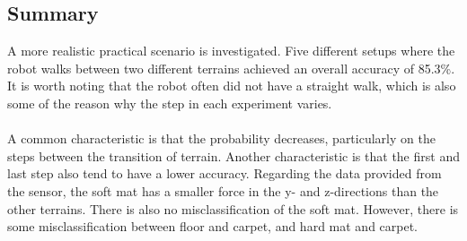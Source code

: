 \documentclass[USenglish]{ifimaster}  %
\begin{document}
	\begin{table}[h]
		\centering
		\caption[Results of transistion from soft mat to carpet]{Estimated probability of each terrain per step walking from soft mat to carpet. Values are marked green to represent correct predictions. For incorrect predictions, the actual value is marked yellow while the predicted value is marked red.}
		\label{tab:softcarpet}
	\end{table}
	\FloatBarrier
\newpage

\subsection{Summary}
A more realistic practical scenario is investigated. Five different setups where the robot walks between two different terrains achieved an overall accuracy of 85.3\%. It is worth noting that the robot often did not have a straight walk, which is also some of the reason why the step in each experiment varies. 
\\
\\
A common characteristic is that the probability decreases, particularly on the steps between the transition of terrain. Another characteristic is that the first and last step also tend to have a lower accuracy. Regarding the data provided from the sensor, the soft mat has a smaller force in the y- and z-directions than the other terrains. There is also no misclassification of the soft mat. However, there is some misclassification between floor and carpet, and hard mat and carpet.
\end{document}
